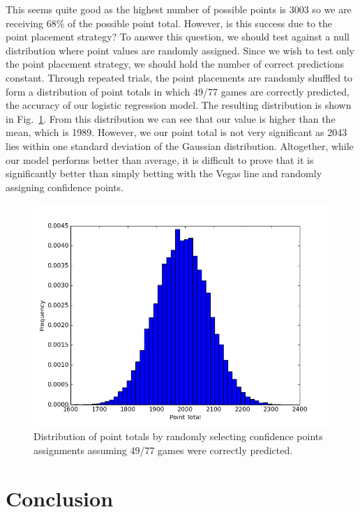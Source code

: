 \documentclass[12pt]{article}
\begin{document}
This seems quite good as the highest number of possible points is 3003 so we are receiving 68\% of the possible point total. However, is this success due to the point placement strategy? To answer this question, we should test against a null distribution where point values are randomly assigned. Since we wish to test only the point placement strategy, we should hold the number of correct predictions constant. Through repeated trials, the point placements are randomly shuffled to form a distribution of point totals in which 49/77 games are correctly predicted, the accuracy of our logistic regression model. The resulting distribution is shown in Fig.~\ref{fig::bootstrap}. From this distribution we can see that our value is higher than the mean, which is 1989. However, we our point total is not very significant as 2043 lies within one standard deviation of the Gaussian distribution. Altogether, while our model performs better than average, it is difficult to prove that it is significantly better than simply betting with the Vegas line and randomly assigning confidence points.

\begin{figure}[h!]
	\begin{center}
		\includegraphics[scale=0.45]{figs/bootstrap_points.png}
	\end{center}
	\caption{Distribution of point totals by randomly selecting confidence points assignments assuming 49/77 games were correctly predicted.}
	\label{fig::bootstrap}
\end{figure}

\newpage
\section{Conclusion}
\end{document}
